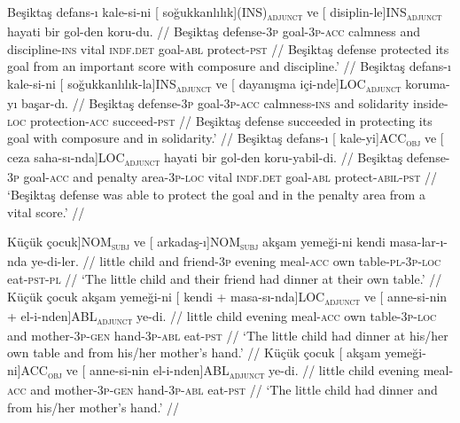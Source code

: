 \pex[exno=TS9,glspace=!1em,everygla={},everyglb={},aboveglbskip=-.15ex, interpartskip=15pt]
\label{TS9-case}
\a
\begingl
\gla Beşiktaş defans-ı kale-si-ni {[} soğukkanlılık{]}(INS)\textsubscript{\textsc{adjunct}} ve {[} disiplin-le{]}INS\textsubscript{\textsc{adjunct}} hayati bir gol-den koru-du. //
\glb Beşiktaş defense-\textsc{3p} goal-\textsc{3p}-\textsc{acc} calmness and discipline-\textsc{ins} vital \textsc{indf.det} goal-\textsc{abl} protect-\textsc{pst} //
\glft Beşiktaş defense protected its goal from an important score with composure and discipline.' //
\endgl
\a
\begingl
\gla Beşiktaş defans-ı kale-si-ni {[} soğukkanlılık-la{]}INS\textsubscript{\textsc{adjunct}} ve {[} dayanışma içi-nde{]}LOC\textsubscript{\textsc{adjunct}} koruma-yı başar-dı. //
\glb Beşiktaş defense-\textsc{3p} goal-\textsc{3p}-\textsc{acc} calmness-\textsc{ins} and solidarity inside-\textsc{loc} protection-\textsc{acc} succeed-\textsc{pst} //
\glft Beşiktaş defense succeeded in protecting its goal with composure and in solidarity.' //
\endgl
\a
\begingl
\gla Beşiktaş defans-ı {[} kale-yi{]}ACC\textsubscript{\textsc{obj}} ve {[} ceza saha-sı-nda{]}LOC\textsubscript{\textsc{adjunct}} hayati bir gol-den koru-yabil-di. //
\glb Beşiktaş defense-\textsc{3p} goal-\textsc{acc} and penalty area-\textsc{3p}-\textsc{loc} vital \textsc{indf.det} goal-\textsc{abl} protect-\textsc{abil}-\textsc{pst} //
\glft `Beşiktaş defense was able to protect the goal and in the penalty area from a vital score.' //
\endgl
\xe

\pex[exno=TS10,glspace=!1em,everygla={},everyglb={},aboveglbskip=-.15ex, interpartskip=15pt]
\label{TS10-case}
\a
\begingl
\gla {[} Küçük çocuk{]}NOM\textsubscript{\textsc{subj}} ve {[} arkadaş-ı{]}NOM\textsubscript{\textsc{subj}} akşam yemeği-ni kendi masa-lar-ı-nda ye-di-ler. //
\glb little child and friend-\textsc{3p} evening meal-\textsc{acc} own table-\textsc{pl}-\textsc{3p}-\textsc{loc} eat-\textsc{pst}-\textsc{pl} //
\glft `The little child and their friend had dinner at their own table.' //
\endgl
\a
\begingl
\gla Küçük çocuk akşam yemeği-ni {[} kendi + masa-sı-nda{]}LOC\textsubscript{\textsc{adjunct}} ve {[} anne-si-nin + el-i-nden{]}ABL\textsubscript{\textsc{adjunct}} ye-di. //
\glb little child evening meal-\textsc{acc} own table-\textsc{3p}-\textsc{loc} and mother-\textsc{3p}-\textsc{gen} hand-\textsc{3p}-\textsc{abl} eat-\textsc{pst} //
\glft `The little child had dinner at his/her own table and from his/her mother's hand.' //
\endgl
\a
\begingl
\gla Küçük çocuk {[} akşam yemeği-ni{]}ACC\textsubscript{\textsc{obj}} ve {[} anne-si-nin el-i-nden{]}ABL\textsubscript{\textsc{adjunct}} ye-di. //
\glb little child evening meal-\textsc{acc} and mother-\textsc{3p}-\textsc{gen} hand-\textsc{3p}-\textsc{abl} eat-\textsc{pst} //
\glft `The little child had dinner and from his/her mother's hand.' //
\endgl
\xe

